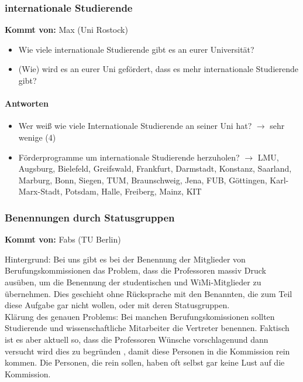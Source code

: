     \subsubsection*{internationale Studierende}
      \textbf{Kommt von:} Max (Uni Rostock)

      \begin{itemize}
        \item Wie viele internationale Studierende gibt es an eurer Universität?
        \item (Wie) wird es an eurer Uni gefördert, dass es mehr internationale Studierende gibt?
      \end{itemize}

      \paragraph{Antworten}
        \begin{itemize}
          \item Wer weiß wie viele Internationale Studierende an seiner Uni hat? $\rightarrow$ sehr wenige (4)
          \item Förderprogramme um internationale Studierende herzuholen? $\rightarrow$ LMU, Augsburg, Bielefeld, Greifswald, Frankfurt, Darmstadt, Konstanz, Saarland, Marburg, Bonn, Siegen, TUM, Braunschweig, Jena, FUB, Göttingen, Karl-Marx-Stadt, Potsdam, Halle, Freiberg, Mainz, KIT
        \end{itemize}

    \subsubsection*{Benennungen durch Statusgruppen}
      \textbf{Kommt von:} Fabs (TU Berlin)

Hintergrund: Bei uns gibt es bei der Benennung der Mitglieder von Berufungskommissionen das Problem, dass die Professoren massiv Druck ausüben, um die Benennung der studentischen und WiMi-Mitglieder zu \flqq übernehmen\frqq. Dies geschieht ohne Rücksprache mit den Benannten, die zum Teil diese Aufgabe gar nicht wollen, oder mit deren Statusgruppen. \\

Klärung des genauen Problems:
Bei manchen Berufungskomissionen sollten Studierende und wissenschaftliche Mitarbeiter die Vertreter benennen.
Faktisch ist es aber aktuell so, dass die Professoren Wünsche \flqq vorschlagen\frqq und dann versucht wird dies zu \flqq begründen \frqq, damit diese Personen in die Kommission rein kommen. Die Personen, die rein sollen, haben oft selbst gar keine Lust auf die Kommission. \\

